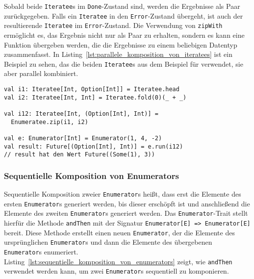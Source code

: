 Sobald beide \lstinline|Iteratee|s im \lstinline|Done|-Zustand sind, werden die Ergebnisse als Paar zurückgegeben.
Falls ein \lstinline|Iteratee| in den \lstinline|Error|-Zustand übergeht, ist auch der resultierende \lstinline|Iteratee| im \lstinline|Error|-Zustand.
Die Verwendung von \lstinline|zipWith| ermöglicht es, das Ergebnis nicht nur als Paar zu erhalten, sondern es kann eine Funktion übergeben werden, die die Ergebnisse zu einem beliebigen Datentyp zusammenfasst.
In Listing~\ref{lst:parallele_komposition_von_iteratees} ist ein Beispiel zu sehen, das die beiden \lstinline|Iteratee|s aus dem Beispiel für  verwendet, sie aber parallel kombiniert.

\begin{lstlisting}[caption=Parallele Komposition von Iteratees, label=lst:parallele_komposition_von_iteratees]
val i1: Iteratee[Int, Option[Int]] = Iteratee.head
val i2: Iteratee[Int, Int] = Iteratee.fold(0)(_ + _)

val i12: Iteratee[Int, (Option[Int], Int)] =
  Enumeratee.zip(i1, i2)

val e: Enumerator[Int] = Enumerator(1, 4, -2)
val result: Future[(Option[Int], Int)] = e.run(i12)
// result hat den Wert Future((Some(1), 3))
\end{lstlisting}


\subsubsection{Sequentielle Komposition von Enumerators} %
\label{ssub:anwendung_sequentielle_komposition_von_enumerators}

Sequentielle Komposition zweier \lstinline|Enumerator|s heißt, dass erst die Elemente des ersten \lstinline|Enumerator|s generiert werden, bis dieser erschöpft ist und anschließend die Elemente des zweiten \lstinline|Enumerator|s generiert werden.
Das \lstinline|Enumerator|-Trait stellt hierfür die Methode \lstinline|andThen| mit der Signatur \lstinline[breaklines=true]|Enumerator[E] => Enumerator[E]| bereit.
Diese Methode erstellt einen neuen \lstinline|Enumerator|, der die Elemente des ursprünglichen \lstinline|Enumerator|s und dann die Elemente des übergebenen \lstinline|Enumerator|s enumeriert.
Listing~\ref{lst:sequentielle_komposition_von_enumerators} zeigt, wie \lstinline|andThen| verwendet werden kann, um zwei \lstinline|Enumerator|s sequentiell zu komponieren.

